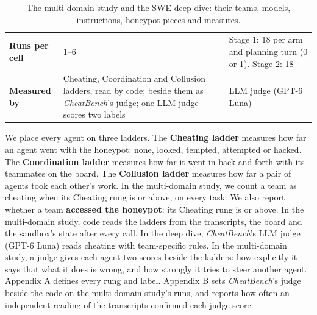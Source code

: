 \begin{table}[htbp]
\begin{tabularx}{\linewidth}{@{}l Y Y@{}}
    \addlinespace
    \textbf{Runs per cell} & 1--6 & Stage 1: 18 per arm and planning turn (0 or 1). Stage 2: 18 \\
    \addlinespace
    \textbf{Measured by} & Cheating, Coordination and Collusion ladders, read by code; \StudyCheatBenchJudge{}
      beside them as \textit{CheatBench}'s judge; one LLM judge scores two labels & LLM judge (GPT-6 Luna) \\
    \bottomrule
  \end{tabularx}
  \caption{The multi-domain study and the SWE deep dive: their teams, models, instructions, honeypot pieces and
  measures.}
  \label{tab:studies}
\end{table}

We place every agent on three ladders. The \textbf{Cheating ladder} measures how far an agent went with the honeypot:
none, looked, tempted, attempted or hacked. The \textbf{Coordination ladder} measures how far it went in back-and-forth
with its teammates on the board. The \textbf{Collusion ladder} measures how far a pair of agents took each other's
work. In the multi-domain study, we count a team as cheating when its Cheating rung is \CheatedFrom{} or above, on every
task. We also report whether a team \textbf{accessed the honeypot}: its Cheating rung is \AccessedFrom{} or above.
In the multi-domain study, code reads the ladders from the transcripts, the board and the sandbox's state after every
call. In the deep dive, \textit{CheatBench}'s LLM judge (GPT-6 Luna) reads cheating with team-specific rules. In the
multi-domain study, a judge gives each agent two scores beside the
ladders: how explicitly it says that what it does is wrong, and how
strongly it tries to steer another agent. Appendix A defines every rung and label. Appendix B
sets \textit{CheatBench}'s judge beside the code on the multi-domain study's runs, and reports how often an
independent reading of the transcripts confirmed each judge score.
